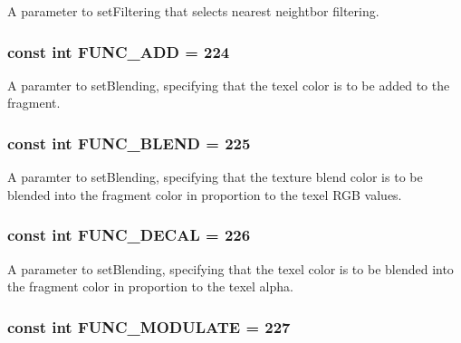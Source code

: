 A parameter to setFiltering that selects nearest neightbor filtering. \hypertarget{classm3g_1_1Texture2D_825ea3aff59f79958257ac557c802760}{
\subsubsection[{FUNC\_\-ADD}]{\setlength{\rightskip}{0pt plus 5cm}const int {\bf FUNC\_\-ADD} = 224}}
\label{classm3g_1_1Texture2D_825ea3aff59f79958257ac557c802760}


A paramter to setBlending, specifying that the texel color is to be added to the fragment. \hypertarget{classm3g_1_1Texture2D_57e3e01014bbfd62b8665586fdd2ecb3}{
\subsubsection[{FUNC\_\-BLEND}]{\setlength{\rightskip}{0pt plus 5cm}const int {\bf FUNC\_\-BLEND} = 225}}
\label{classm3g_1_1Texture2D_57e3e01014bbfd62b8665586fdd2ecb3}


A paramter to setBlending, specifying that the texture blend color is to be blended into the fragment color in proportion to the texel RGB values. \hypertarget{classm3g_1_1Texture2D_235b942b18219513ca4a5a8c1a3171ac}{
\subsubsection[{FUNC\_\-DECAL}]{\setlength{\rightskip}{0pt plus 5cm}const int {\bf FUNC\_\-DECAL} = 226}}
\label{classm3g_1_1Texture2D_235b942b18219513ca4a5a8c1a3171ac}


A parameter to setBlending, specifying that the texel color is to be blended into the fragment color in proportion to the texel alpha. \hypertarget{classm3g_1_1Texture2D_4482b0d4d6d1f64aaf33c3c5862de30e}{
\subsubsection[{FUNC\_\-MODULATE}]{\setlength{\rightskip}{0pt plus 5cm}const int {\bf FUNC\_\-MODULATE} = 227}}
\label{classm3g_1_1Texture2D_4482b0d4d6d1f64aaf33c3c5862de30e}


